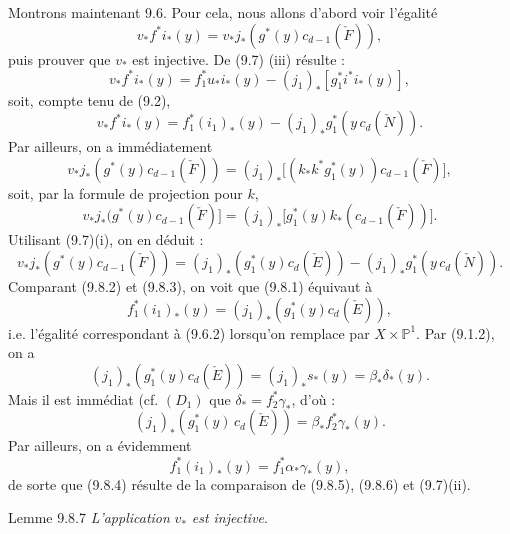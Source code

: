 Montrons maintenant 9.6. Pour cela, nous allons d'abord voir l'égalité
\[
v_*f^*i_*(y)=v_*j_*(g^*(y)c_{d-1}(\check F)),
\tag{9.8.1}
\]
puis prouver que $v_*$ est injective. De (9.7) (iii) résulte :
\[
v_*f^*i_*(y)=f_1^*u_*i_*(y)-(j_1)_*[g_1^*i^*i_*(y)],
\]
soit, compte tenu de (9.2),
\[
v_*f^*i_*(y)=f_1^*(i_1)_*(y)-(j_1)_*g_1^*(y\,c_d(\check N)).
\tag{9.8.2}
\]
Par ailleurs, on a immédiatement
\[
v_*j_*(g^*(y)c_{d-1}(\check F))
=(j_1)_*\bigl[(k_*k^*g_1^*(y))c_{d-1}(\check F)\bigr],
\]
soit, par la formule de projection pour $k$,
\[
v_*j_*(g^*(y)c_{d-1}(\check F)]
=(j_1)_*\bigl[g_1^*(y)k_*(c_{d-1}(\check F))\bigr].
\]
Utilisant (9.7)(i), on en déduit :
\[
v_*j_*(g^*(y)c_{d-1}(\check F))
=(j_1)_*(g_1^*(y)c_d(\check E))-(j_1)_*g_1^*(y\,c_d(\check N)).
\tag{9.8.3}
\]
Comparant (9.8.2) et (9.8.3), on voit que (9.8.1) équivaut à
\[
f_1^*(i_1)_*(y)=(j_1)_*(g_1^*(y)c_d(\check E)),
\tag{9.8.4}
\]
i.e. l'égalité correspondant à (9.6.2) lorsqu'on remplace par $X\times\mathbb{P}^1$. Par (9.1.2), on a
\[
(j_1)_*(g_1^*(y)c_d(\check E))=(j_1)_*s_*(y)=\beta_*\delta_*(y).
\]
Mais il est immédiat (cf. $(D_1)$ que $\delta_*=f_2^*\gamma_*$, d'où :
\[
(j_1)_*(g_1^*(y)\,c_d(\check E))=\beta_*f_2^*\gamma_*(y).
\tag{9.8.5}
\]
Par ailleurs, on a évidemment
\[
f_1^*(i_1)_*(y)=f_1^*\alpha_*\gamma_*(y),
\tag{9.8.6}
\]
de sorte que (9.8.4) résulte de la comparaison de (9.8.5), (9.8.6) et (9.7)(ii).

\begin{statement}{Lemme 9.8.7}
\emph{L'application} $v_*$ \emph{est injective}.
\end{statement}

